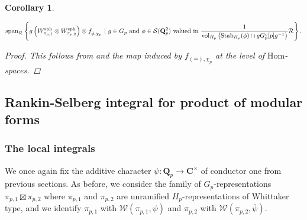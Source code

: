 \documentclass{amsart}%
\theoremstyle{plain}
\newtheorem{cor}[thm]{Corollary}
\newcommand\scalemath[2]{\scalebox{#1}{\mbox{\ensuremath{\displaystyle #2}}}}
\theoremstyle{plain}
\theoremstyle{remark}
\DeclareMathOperator{\vol}{vol}
\begin{document}
\begin{cor}
\begin{enumerate}
\begin{align*}
            \scalemath{0.9}{\mathrm{span}_{\mathcal{R}}\left\{ g\left(W_{\pi_{p,1}}^\mathrm{sph}\otimes W_{\pi_{p,2}}^\mathrm{sph}\right)\otimes f_{\hat{\phi},\chi_p} \ |\ g\in G_p\ \mathrm{and}\ \phi\in\mathcal{S}(\mathbf{Q}_p^2)\ \mathrm{valued}\ \mathrm{in}\ \frac{1}{\vol_{H_p}\left(\mathrm{Stab}_{H_p}(\phi)\cap g G_p^\circ[p] g^{-1}\right)}\mathcal{R}\right\}.}
        \end{align*}
        \end{enumerate}
        \begin{proof}
            This follows from  and the map induced by $f_{(\hat{-}),\chi_p}$ at the level of $\mathrm{Hom}$-spaces.
        \end{proof}
\end{cor}











\subsection{Rankin-Selberg integral for product of modular forms}\label{rankin selber integrals}
\subsubsection{The local integrals}\label{sec local integrals}
We once again fix the additive character $\psi:\mathbf{Q}_p\rightarrow\mathbf{C}^\times$ of conductor one from previous sections. As before, we consider the family of $G_p$-representations $\pi_{p,1}\boxtimes \pi_{p,2}$ where $\pi_{p,1}$ and $\pi_{p,2}$ are unramified $H_p$-representations of Whittaker type, and we identify $\pi_{p,1}$ with $\mathcal{W}(\pi_{p,1},\psi)$ and $\pi_{p,2}$ with $\mathcal{W}(\pi_{p,2},\overline{\psi})$.
\end{document}

